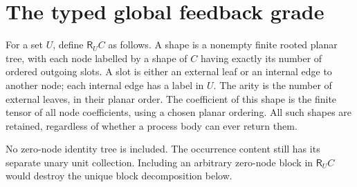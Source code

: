 \documentclass[11pt]{article}
\newcommand{\R}{\mathsf R}\newcommand{\Col}{\mathsf{Col}}\newcommand{\Vect}{\mathbf{Vect}_k}
\begin{document}
\section{The typed global feedback grade}
For a set $U$, define $\R_U C$ as follows. A shape is a nonempty finite rooted planar tree, with each node labelled by a shape of $C$ having exactly its number of ordered outgoing slots. A slot is either an external leaf or an internal edge to another node; each internal edge has a label in $U$. The arity is the number of external leaves, in their planar order. The coefficient of this shape is the finite tensor of all node coefficients, using a chosen planar ordering. All such shapes are retained, regardless of whether a process body can ever return them.

No zero-node identity tree is included. The occurrence content still has its separate unary unit collection. Including an arbitrary zero-node block in $\R_U C$ would destroy the unique block decomposition below.
\end{document}
